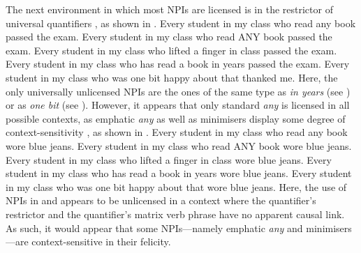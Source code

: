 The next environment in which most NPIs are licensed is in the restrictor of universal quantifiers \parencite{Ladusaw1980,Wouden1997}, as shown in .
\pex\label{ex:npi-every-okay}
\a Every student in my class who read any book passed the exam.
\a Every student in my class who read \MakeUppercase{any} book passed the exam.
\a Every student in my class who lifted a finger in class passed the exam.
\a\ljudge{\#} Every student in my class who has read a book in years passed the exam.
\a\ljudge{\#} Every student in my class who was one bit happy about that thanked me.
\xe
Here, the only universally unlicensed NPIs are the ones of the same type as \textit{in years} (see ) or as \textit{one bit} (see ). However, it appears that only standard \textit{any} is licensed in all possible contexts, as emphatic \textit{any} as well as minimisers display some degree of context-sensitivity \parencite{Heim1984,Schwarz2000,Crnic2011,Crnic2014-dogma,Crnic2014-nm}, as shown in .
\pex\label{ex:npi-every-bad}
\a Every student in my class who read any book wore blue jeans.
\a\ljudge{\#} Every student in my class who read \MakeUppercase{any} book wore blue jeans.
\a\ljudge{\#} Every student in my class who lifted a finger in class wore blue jeans.
\a\ljudge{\#} Every student in my class who has read a book in years wore blue jeans.
\a\ljudge{\#} Every student in my class who was one bit happy about that wore blue jeans.
\xe
Here, the use of NPIs in  and  appears to be unlicensed in a context where the quantifier's restrictor and the quantifier's matrix verb phrase have no apparent causal link. As such, it would appear that some NPIs---namely emphatic \textit{any} and minimisers---are context-sensitive in their felicity.

